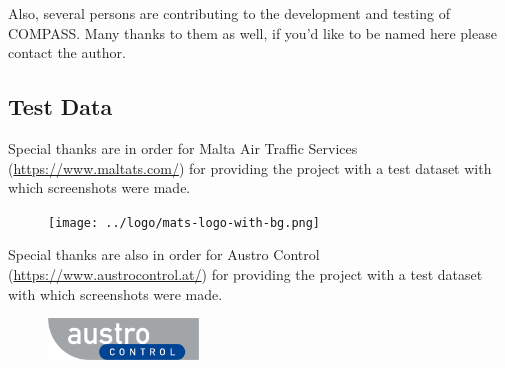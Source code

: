 Also, several persons are contributing to the development and testing of COMPASS. Many thanks to them as well, if you'd like to be named here please contact the author.

\subsection{Test Data}

Special thanks are in order for Malta Air Traffic Services (\url{https://www.maltats.com/}) for providing the project with a test dataset with which screenshots were made. \\

\begin{figure}[H]
  \center
    \texttt{[image: ../logo/mats-logo-with-bg.png]}
\end{figure}

Special thanks are also in order for Austro Control (\url{https://www.austrocontrol.at/}) for providing the project with a test dataset with which screenshots were made. \\

\begin{figure}[H]
  \center
    \includegraphics[width=4cm]{../logo/Logo_Austro_Control.png}
\end{figure}




